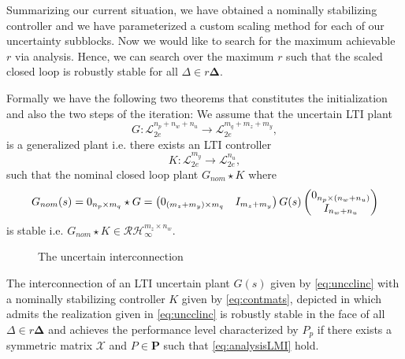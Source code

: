 Summarizing our current situation, we have obtained a nominally stabilizing controller and we have parameterized a custom scaling method 
for each of our uncertainty subblocks. Now we would like to search for the maximum achievable $r$ via analysis. Hence, we can search over 
the maximum $r$ such that the scaled closed loop is robustly stable for all $\Delta\in r\bm{\Delta}$. 



Formally we have the following two theorems that constitutes the initialization and also the two steps of the iteration: We assume that 
the uncertain LTI plant 
\[
G:\mathcal{L}_{2e}^{n_p+n_w+n_u}\to\mathcal{L}_{2e}^{m_q+m_z+m_y},
\] 
is a generalized plant i.e. there exists an LTI controller 
\[
K:\mathcal{L}_{2e}^{m_y}\to\mathcal{L}_{2e}^{n_u},
\]
such that the nominal closed loop plant $G_{nom}\star K$ where 
\[
G_{nom}(s) = 0_{n_p\times m_q}\star G = \begin{pmatrix}0_{(m_z+m_y)\times m_q} &I_{m_z+m_y}\end{pmatrix}G(s)\begin{pmatrix}0_{n_p\times(n_w+n_u)}\\I_{n_w+n_u}\end{pmatrix} 
\]
is stable i.e. $G_{nom}\star K\in\mathcal{RH}_\infty^{m_z\times n_w}$.

\begin{figure}%
\centering
{}
\caption{The uncertain interconnection}%
\label{fig:uncicsynth}%
\end{figure}

\begin{thm} The interconnection of an LTI uncertain plant $G(s)$ given by \eqref{eq:uncclinc}
with a nominally stabilizing controller $K$ given by \eqref{eq:contmats}, depicted in  
which admits the realization given in \eqref{eq:uncclinc} is robustly stable in the face of all 
$\Delta\in r\bm{\Delta}$ and achieves the performance level characterized by $P_p$ if there exists a symmetric matrix 
$\mathcal{X}$ and $P\in\mathbf{P}$ such that \eqref{eq:analysisLMI} hold.
\end{thm}

